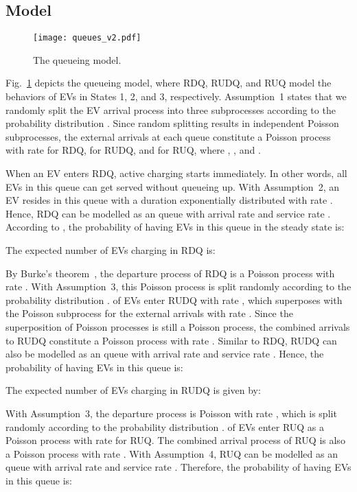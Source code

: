 \documentclass[journal]{IEEEtran}
\begin{document}
\subsection{Model} \label{subsec:model}

\begin{figure}[!t]
\centering
\texttt{[image: queues\_v2.pdf]} 
\caption{The queueing model.}
\label{fig:t_queues}
\end{figure}

Fig.~\ref{fig:t_queues} depicts the queueing model, where RDQ, RUDQ, and RUQ
model the behaviors of EVs in States 1, 2, and 3, respectively.  Assumption~1
states that we randomly split the EV arrival process into three subprocesses
according to the probability distribution .  Since random
splitting results in independent Poisson subprocesses, the external arrivals
at each queue constitute a Poisson process with rate  for RDQ,
 for RUDQ, and  for RUQ, where ,
, and .

When an EV enters RDQ, active charging starts immediately.  In other words, all
EVs in this queue can get served without queueing up.  With Assumption~2, an
EV resides in this queue with a duration exponentially distributed with rate
.  Hence, RDQ can be modelled as an  queue with arrival rate
 and service rate .  According to \cite{queueingtheory}, the
probability  of having  EVs in this queue in the steady state is:


The expected number  of EVs charging in RDQ is:
 

By Burke's theorem~\cite{datanetworks}, the departure process of RDQ is a
Poisson process with rate .  With Assumption~3, this Poisson process
is split randomly according to the probability distribution .
 of EVs enter RUDQ with rate ,
which superposes with the Poisson subprocess for the external arrivals with
rate .  Since the superposition of Poisson processes is still a
Poisson process, the combined arrivals to RUDQ constitute a Poisson process with
rate .  Similar to RDQ, RUDQ can also be modelled
as an  queue with arrival rate  and
 service rate .  Hence, the probability  of having  EVs
in this queue is:


The expected number  of EVs charging in RUDQ is given by:
 

With Assumption~3, the departure process is Poisson with rate
, which is split randomly according to the
probability distribution .   of EVs enter RUQ as
 a Poisson process with rate
 for RUQ.  The
combined arrival process of RUQ is also a Poisson process with rate
.  With Assumption~4, RUQ can be modelled as an
 queue with arrival rate  and service
rate .  Therefore, the probability  of having  EVs in this
queue is:
\end{document}
